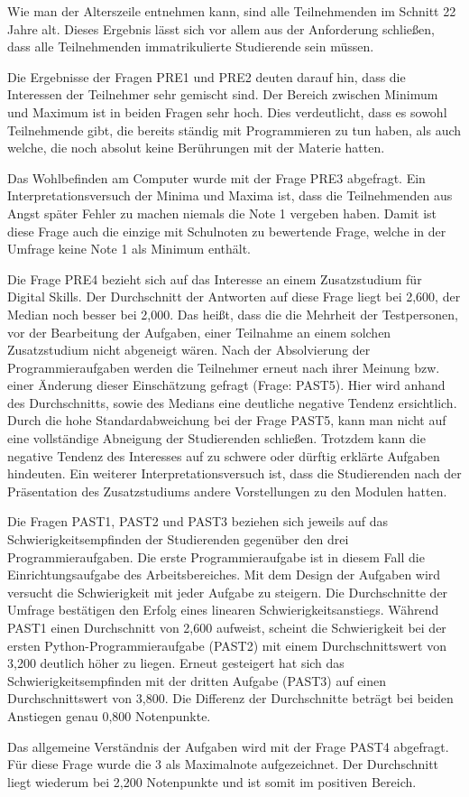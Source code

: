 Wie man der Alterszeile entnehmen kann, sind alle Teilnehmenden im Schnitt 22
Jahre alt. Dieses Ergebnis lässt sich vor allem aus der Anforderung schließen,
dass alle Teilnehmenden immatrikulierte Studierende sein müssen.

Die Ergebnisse der Fragen PRE1 und PRE2 deuten darauf hin, dass die Interessen
der Teilnehmer sehr gemischt sind. Der Bereich zwischen Minimum und Maximum ist
in beiden Fragen sehr hoch. Dies verdeutlicht, dass es sowohl Teilnehmende gibt,
die bereits ständig mit Programmieren zu tun haben, als auch welche, die noch
absolut keine Berührungen mit der Materie hatten.

Das Wohlbefinden am Computer wurde mit der Frage PRE3 abgefragt. Ein
Interpretationsversuch der Minima und Maxima ist, dass die Teilnehmenden aus
Angst später Fehler zu machen niemals die Note 1 vergeben haben. Damit ist diese
Frage auch die einzige mit Schulnoten zu bewertende Frage, welche in der Umfrage
keine Note 1 als Minimum enthält.

Die Frage PRE4 bezieht sich auf das Interesse an einem Zusatzstudium für
Digital Skills. Der Durchschnitt der Antworten auf diese Frage liegt bei 2,600,
der Median noch besser bei 2,000. Das heißt, dass die die Mehrheit der
Testpersonen, vor der Bearbeitung der Aufgaben, einer Teilnahme an einem solchen
Zusatzstudium nicht abgeneigt wären. Nach der Absolvierung der
Programmieraufgaben werden die Teilnehmer erneut nach ihrer Meinung bzw. einer
Änderung dieser Einschätzung gefragt (Frage: PAST5). Hier wird anhand des
Durchschnitts, sowie des Medians eine deutliche negative Tendenz ersichtlich.
Durch die hohe Standardabweichung bei der Frage PAST5, kann man nicht auf eine
vollständige Abneigung der Studierenden schließen. Trotzdem kann die negative
Tendenz des Interesses auf zu schwere oder dürftig erklärte Aufgaben hindeuten.
Ein weiterer Interpretationsversuch ist, dass die Studierenden nach der
Präsentation des Zusatzstudiums andere Vorstellungen zu den Modulen hatten.

Die Fragen PAST1, PAST2 und PAST3 beziehen sich jeweils auf das
Schwierigkeitsempfinden der Studierenden gegenüber den drei Programmieraufgaben.
Die erste Programmieraufgabe ist in diesem Fall die Einrichtungsaufgabe des
Arbeitsbereiches. Mit dem Design der Aufgaben wird versucht die Schwierigkeit
mit jeder Aufgabe zu steigern. Die Durchschnitte der Umfrage bestätigen den
Erfolg eines linearen Schwierigkeitsanstiegs. Während PAST1 einen Durchschnitt
von 2,600 aufweist, scheint die Schwierigkeit bei der ersten
Python-Programmieraufgabe (PAST2) mit einem Durchschnittswert von 3,200 deutlich
höher zu liegen. Erneut gesteigert hat sich das Schwierigkeitsempfinden mit der
dritten Aufgabe (PAST3) auf einen Durchschnittswert von 3,800. Die Differenz der
Durchschnitte beträgt bei beiden Anstiegen genau 0,800 Notenpunkte.

Das allgemeine Verständnis der Aufgaben wird mit der Frage PAST4 abgefragt. Für
diese Frage wurde die 3 als Maximalnote aufgezeichnet. Der Durchschnitt liegt
wiederum bei 2,200 Notenpunkte und ist somit im positiven Bereich.